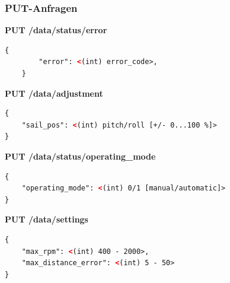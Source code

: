 \subsubsection{PUT-Anfragen}
\textbf{PUT /data/status/error}
\begin{lstlisting}[language=XML, caption={PUT-Request 1}]
	{
		"error": <(int) error_code>,
	}
\end{lstlisting}
\textbf{PUT /data/adjustment}
\begin{lstlisting}[language=XML, caption={PUT-Request 2}]
{
	"sail_pos": <(int) pitch/roll [+/- 0...100 %]>
}
\end{lstlisting}
\textbf{PUT /data/status/operating\_mode}
\begin{lstlisting}[language=XML, caption={PUT-Request 3}]
{
	"operating_mode": <(int) 0/1 [manual/automatic]>
}
\end{lstlisting}
\textbf{PUT /data/settings}
\begin{lstlisting}[language=XML, caption={PUT-Request 4}]
{
	"max_rpm": <(int) 400 - 2000>,
	"max_distance_error": <(int) 5 - 50>
}
\end{lstlisting}








